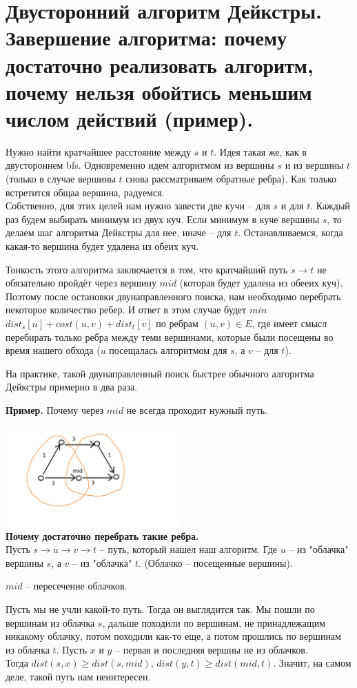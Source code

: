 \setcounter{section}{48}
\section{Двусторонний алгоритм Дейкстры. Завершение алгоритма: почему достаточно реализовать алгоритм, почему нельзя обойтись меньшим числом действий (пример).}

Нужно найти кратчайшее расстояние между $s$ и $t$.
Идея такая же, как в двустороннем bfs. Одновременно идем алгоритмом из вершины $s$ и из вершины $t$ (только в случае вершины $t$ снова рассматриваем обратные ребра).
Как только встретится общаа вершина, радуемся.\\

Собственно, для этих целей нам нужно завести две кучи -- для $s$ и для $t$. Каждый раз будем выбирать минимум из двух куч. Если минимум в куче вершины $s$, то делаем шаг алгоритма Дейкстры для нее, иначе -- для $t$. Останавливаемся, когда какая-то вершина будет удалена из обеих куч.

Тонкость этого алгоритма заключается в том, что кратчайший путь $s \rightarrow t$ не обязательно пройдёт через вершину $mid$ (которая будет удалена из обееих куч). Поэтому после остановки двунаправленного поиска, нам необходимо перебрать некоторое количество ребер.
И ответ в этом случае будет $min$ $dist_s[u] + cost(u, v) + dist_t[v]$ по ребрам $(u, v) \in E$, где имеет смысл перебирать только ребра между теми вершинами, которые были посещены во время нашего обхода ($u$ посещалась алгоритмом для $s$, а $v$ -- для $t$).

На практике, такой двунаправленный поиск быстрее обычного алгоритма Дейкстры примерно в два раза.

\textbf{Пример.} Почему через $mid$ не всегда проходит нужный путь.

\includegraphics[width=0.5\textwidth]{images/49.jpg}\\

\textbf{Почему достаточно перебрать такие ребра.}\\

Пусть $s \to u \to v \to t$ -- путь, который нашел наш алгоритм. Где $u$ -- из "облачка" вершины $s$, а $v$ -- из "облачка" $t$. (Облачко -- посещенные вершины).

$mid$ -- пересечение облачков.

Пусть мы не учли какой-то путь. Тогда он выглядится так. Мы пошли по вершинам из облачка $s$, дальше походили по вершинам, не принадлежащим никакому облачку, потом походили как-то еще, а потом прошлись по вершинам из облачка $t$. Пусть $x$ и $y$ -- первая и последняя вершны не из облачков.\\

Тогда $dist(s, x) \geq dist(s, mid)$, $dist(y, t) \geq dist(mid, t)$. Значит, на самом деле, такой путь нам неинтересен.